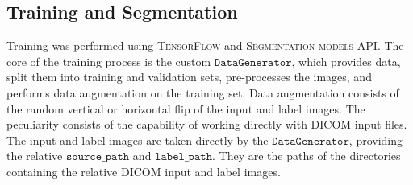 \documentclass{standalone}
\begin{document}
\subsection{Training and Segmentation}

Training was performed using \textsc{TensorFlow}\cite{Tensorflow} and \textsc{Segmentation-models} API\cite{segmentation_models}.
The core of the training process is the custom $\mathtt{DataGenerator}$, which provides data, split them into training and validation sets, pre-processes the images, and performs data augmentation on the training set.
Data augmentation consists of the random vertical or horizontal flip of the input and label images.
The peculiarity consists of the capability of working directly with DICOM input files.
The input and label images are taken directly by the $\mathtt{DataGenerator}$, providing the relative $\mathtt{source\_path}$ and $\mathtt{label\_path}$. They are the paths of the directories containing the relative DICOM input and label images.
\end{document}
